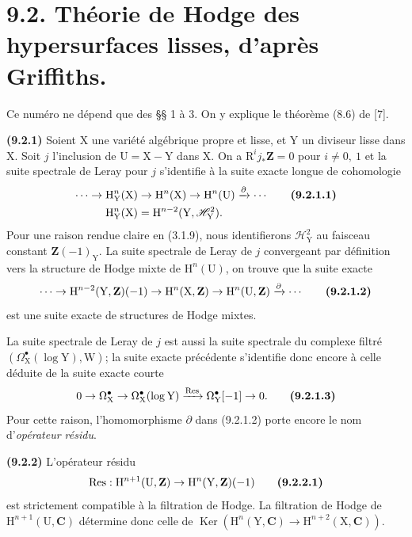 \documentclass[11pt,leqno]{article}
\begin{document}
\section*{9.2. Théorie de Hodge des hypersurfaces lisses, d’après Griffiths.}

Ce numéro ne dépend que des §§ 1 à 3. On y explique le théorème (8.6) de [7].

\textbf{(9.2.1)} Soient \(\mathrm{X}\) une variété algébrique propre et lisse, et \(\mathrm{Y}\) un diviseur lisse dans \(\mathrm{X}\). Soit \(j\) l’inclusion de \(\mathrm{U}=\mathrm{X}-\mathrm{Y}\) dans \(\mathrm{X}\). On a \(\mathrm{R}^{i}j_{*}\mathbf{Z}=0\) pour \(i\neq0,\ 1\) et la suite spectrale de Leray pour \(j\) s’identifie à la suite exacte longue de cohomologie
\begin{align*}
\cdots\to\mathrm{H}_{\mathrm{Y}}^{n}(\mathrm{X})
&\to\mathrm{H}^{n}(\mathrm{X})
\to\mathrm{H}^{n}(\mathrm{U})
\xrightarrow{\partial}\cdots
\tag*{\textbf{(9.2.1.1)}}\\
\mathrm{H}_{\mathrm{Y}}^{n}(\mathrm{X})
&=\mathrm{H}^{n-2}(\mathrm{Y},\mathscr{H}_{\mathrm{Y}}^{2}).
\end{align*}
Pour une raison rendue claire en (3.1.9), nous identifierons \(\mathscr{H}_{\mathrm{Y}}^{2}\) au faisceau constant \(\mathbf{Z}(-1)_{\mathrm{Y}}\). La suite spectrale de Leray de \(j\) convergeant par définition vers la structure de Hodge mixte de \(\mathrm{H}^{n}(\mathrm{U})\), on trouve que la suite exacte
\[
\cdots\to
\mathrm{H}^{n-2}(\mathrm{Y},\mathbf{Z})(-1)
\to\mathrm{H}^{n}(\mathrm{X},\mathbf{Z})
\to\mathrm{H}^{n}(\mathrm{U},\mathbf{Z})
\xrightarrow{\partial}\cdots
\tag*{\textbf{(9.2.1.2)}}
\]
est une suite exacte de structures de Hodge mixtes.

La suite spectrale de Leray de \(j\) est aussi la suite spectrale du complexe filtré \((\Omega_{\mathrm{X}}^{\bullet}(\log\mathrm{Y}),\mathrm{W})\); la suite exacte précédente s’identifie donc encore à celle déduite de la suite exacte courte
\[
0\to\Omega_{\mathrm{X}}^{\bullet}
\to\Omega_{\mathrm{X}}^{\bullet}(\log\mathrm{Y})
\xrightarrow{\operatorname{Res}}
\Omega_{\mathrm{Y}}^{\bullet}[-1]\to0.
\tag*{\textbf{(9.2.1.3)}}
\]
Pour cette raison, l’homomorphisme \(\partial\) dans (9.2.1.2) porte encore le nom d’\textit{opérateur résidu}.

\textbf{(9.2.2)} L’opérateur résidu
\[
\operatorname{Res}:\mathrm{H}^{n+1}(\mathrm{U},\mathbf{Z})
\to\mathrm{H}^{n}(\mathrm{Y},\mathbf{Z})(-1)
\tag*{\textbf{(9.2.2.1)}}
\]
est strictement compatible à la filtration de Hodge. La filtration de Hodge de \(\mathrm{H}^{n+1}(\mathrm{U},\mathbf{C})\) détermine donc celle de \(\operatorname{Ker}(\mathrm{H}^{n}(\mathrm{Y},\mathbf{C})\to\mathrm{H}^{n+2}(\mathrm{X},\mathbf{C}))\).
\end{document}
